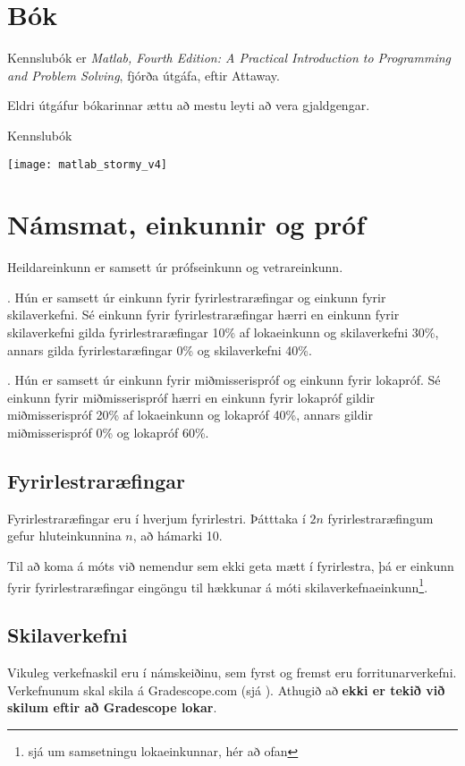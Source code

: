 \documentclass[justified, nobib]{tufte-handout}
\begin{document}
\section{Bók}
Kennslubók er \emph{Matlab, Fourth Edition: A Practical Introduction to Programming and Problem Solving}, fjórða útgáfa, eftir Attaway.

Eldri útgáfur bókarinnar ættu að mestu leyti að vera gjaldgengar.

\begin{marginfigure}
\caption{Kennslubók}
\begin{center}
\texttt{[image: matlab\_stormy\_v4]}
\end{center}
\end{marginfigure}

\newpage

\section{Námsmat, einkunnir og próf}
Heildareinkunn er samsett úr prófseinkunn og vetrareinkunn.

. Hún er samsett úr einkunn fyrir fyrirlestraræfingar og einkunn fyrir skilaverkefni. Sé einkunn fyrir fyrirlestraræfingar hærri en einkunn fyrir skilaverkefni gilda fyrirlestraræfingar 10\% af lokaeinkunn og skilaverkefni 30\%, annars gilda fyrirlestaræfingar 0\% og skilaverkefni 40\%.

. Hún er samsett úr einkunn fyrir miðmisserispróf og einkunn fyrir lokapróf. Sé einkunn fyrir miðmisserispróf hærri en einkunn fyrir lokapróf gildir miðmisserispróf 20\% af lokaeinkunn og lokapróf 40\%, annars gildir miðmisserispróf 0\% og lokapróf 60\%.
\subsection{Fyrirlestraræfingar}
\label{sec:lecture-exercises}
Fyrirlestraræfingar eru í hverjum fyrirlestri. Þátttaka í $2n$ fyrirlestraræfingum gefur hluteinkunnina $n$, að hámarki 10.

Til að koma á móts við nemendur sem ekki geta mætt í fyrirlestra, þá er einkunn fyrir fyrirlestraræfingar eingöngu til hækkunar á móti skilaverkefnaeinkunn\footnote{sjá um samsetningu lokaeinkunnar, hér að ofan}.
\subsection{Skilaverkefni}
Vikuleg verkefnaskil eru í námskeiðinu, sem fyrst og fremst eru forritunarverkefni. Verkefnunum skal skila á Gradescope.com (sjá ). Athugið að \textbf{ekki er tekið við skilum eftir að Gradescope lokar}.
\end{document}

